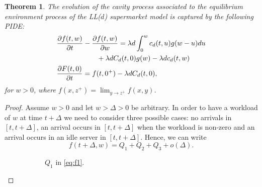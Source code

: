 \documentclass[12pt]{report}
\newtheorem{theorem}{Theorem}
\begin{document}
\begin{theorem}\label{th:PIDE}
The evolution of the cavity process associated to the equilibrium environment process of the LL($d$)
supermarket model is captured by the following PIDE: 
\begin{align}\label{eq:PIDE}
&\frac{\partial f(t,w)}{\partial t} - \frac{\partial f(t,w)}{\partial w} = \lambda d\int_0^w c_d(t,u) g(w-u) du \nonumber \\ 
&\hspace*{2cm} + \lambda d C_d(t,0) g(w) - \lambda d c_d(t,w) \\
&\frac{\partial F(t,0)}{\partial t} = f(t,0^+) - \lambda d C_d(t,0),
\label{eq:ODEF0}
\end{align}
for $w>0$, where $f(x,z^+) = \lim_{y \rightarrow z^+} f(x,y)$.
\end{theorem}
\begin{proof}
Assume $w > 0$ and let $w > \Delta > 0$ be arbitrary. 
In order to have a workload of $w$ at time $t+ \Delta$ we need to consider three possible cases:
no arrivals in $[t,t+\Delta]$, an arrival occurs in $[t,t+\Delta]$ when the workload is non-zero and an arrival occurs in an idle server in $[t,t+\Delta]$. Hence, we can write     
\begin{equation}\label{eq:f1}
f(t+\Delta, w) = Q_1 + Q_2 + Q_3 + o(\Delta).
\end{equation}
\begin{figure}
\begin{center}
\begin{subfigure}{.45\textwidth}
\caption{$Q_1$ in \eqref{eq:f1}.}
\end{subfigure}
\begin{subfigure}{.45\textwidth}
\end{subfigure}
\end{center}
\end{figure}
\end{proof}
\end{document}
